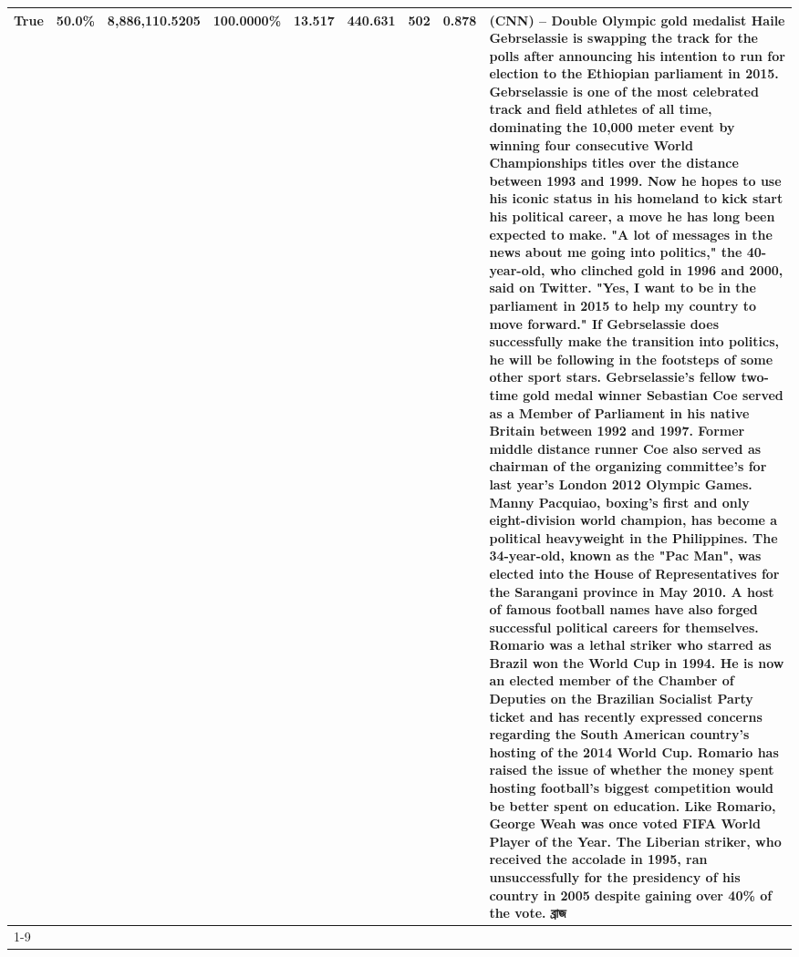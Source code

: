 \begin{table}[H]
{\begin{tabular}{lllrlllll}
True & 50.0\% & 8,886,110.5205 & \bfseries \color{red} 100.0000\% & 13.517 & 440.631 & 502 & 0.878 & (CNN) -- Double Olympic gold medalist Haile Gebrselassie is swapping the track for the polls after announcing his intention to run for election to the Ethiopian parliament in 2015. Gebrselassie is one of the most celebrated track and field athletes of all time, dominating the 10,000 meter event by winning four consecutive World Championships titles over the distance between 1993 and 1999. Now he hopes to use his iconic status in his homeland to kick start his political career, a move he has long been expected to make. "A lot of messages in the news about me going into politics," the 40-year-old, who clinched gold in 1996 and 2000, said on Twitter. "Yes, I want to be in the parliament in 2015 to help my country to move forward." If Gebrselassie does successfully make the transition into politics, he will be following in the footsteps of some other sport stars. Gebrselassie's fellow two-time gold medal winner Sebastian Coe served as a Member of Parliament in his native Britain between 1992 and 1997. Former middle distance runner Coe also served as chairman of the organizing committee's for last year's London 2012 Olympic Games. Manny Pacquiao, boxing's first and only eight-division world champion, has become a political heavyweight in the Philippines. The 34-year-old, known as the "Pac Man", was elected into the House of Representatives for the Sarangani province in May 2010. A host of famous football names have also forged successful political careers for themselves. Romario was a lethal striker who starred as Brazil won the World Cup in 1994. He is now an elected member of the Chamber of Deputies on the Brazilian Socialist Party ticket and has recently expressed concerns regarding the South American country's hosting of the 2014 World Cup. Romario has raised the issue of whether the money spent hosting football's biggest competition would be better spent on education. Like Romario, George Weah was once voted FIFA World Player of the Year. The Liberian striker, who received the accolade in 1995, ran unsuccessfully for the presidency of his country in 2005 despite gaining over 40\% of the vote. ব্রাজ \\
\cline{1-9}

\end{tabular}}
\end{table}
